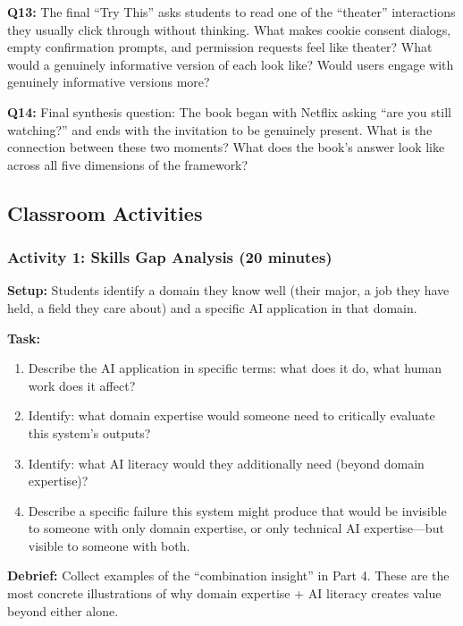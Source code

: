 \textbf{Q13:} The final ``Try This'' asks students to read one of the ``theater'' interactions they usually click through without thinking. What makes cookie consent dialogs, empty confirmation prompts, and permission requests feel like theater? What would a genuinely informative version of each look like? Would users engage with genuinely informative versions more?

\textbf{Q14:} Final synthesis question: The book began with Netflix asking ``are you still watching?'' and ends with the invitation to be genuinely present. What is the connection between these two moments? What does the book's answer look like across all five dimensions of the framework?

\subsection*{Classroom Activities}

\subsubsection*{Activity 1: Skills Gap Analysis (20 minutes)}

\textbf{Setup:} Students identify a domain they know well (their major, a job they have held, a field they care about) and a specific AI application in that domain.

\textbf{Task:}
\begin{enumerate}
    \item Describe the AI application in specific terms: what does it do, what human work does it affect?
    \item Identify: what domain expertise would someone need to critically evaluate this system's outputs?
    \item Identify: what AI literacy would they additionally need (beyond domain expertise)?
    \item Describe a specific failure this system might produce that would be invisible to someone with only domain expertise, or only technical AI expertise---but visible to someone with both.
\end{enumerate}

\textbf{Debrief:} Collect examples of the ``combination insight'' in Part 4. These are the most concrete illustrations of why domain expertise + AI literacy creates value beyond either alone.

